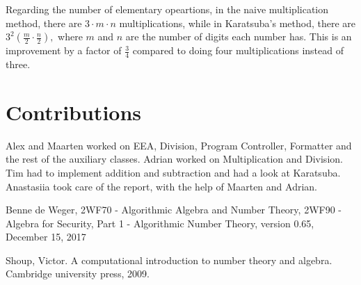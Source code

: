 \documentclass[a4paper]{article}
\begin{document}
Regarding the number of elementary opeartions, in the naive multiplication method, there are $ 3 \cdot m \cdot n$ multiplications, while in Karatsuba's method, there are $ 3^{2} (\frac{m}{2} \cdot \frac{n}{2}), $ where $m$ and $n$ are the number of digits each number has. This is an improvement by a factor of $\frac{3}{4}$ compared to doing four multiplications instead of three.


\section{Contributions}

Alex and Maarten worked on EEA, Division, Program Controller, Formatter and the rest of the auxiliary classes.
Adrian worked on Multiplication and Division.
Tim had to implement addition and subtraction and had a look at Karatsuba.
Anastasiia took care of the report, with the help of Maarten and Adrian.  

\begin{thebibliography}{9}

  Benne de Weger,
  2WF70 - Algorithmic Algebra and Number Theory,
  2WF90 - Algebra for Security,
  Part 1 - Algorithmic Number Theory,
  version 0.65,
  December 15, 2017

Shoup, Victor. A computational introduction to number theory and algebra. Cambridge university press, 2009.


\end{thebibliography}
\end{document}
